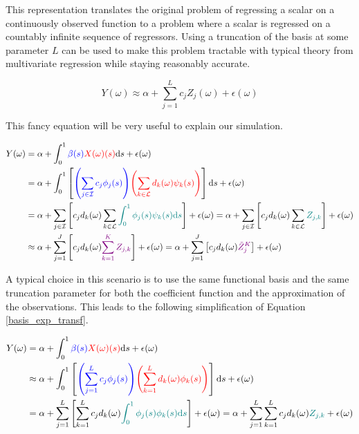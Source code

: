\documentclass[11pt,twoside,a4paper]{article}
\begin{document}
	This representation translates the original problem of regressing a scalar on a continuously observed function to a problem where a scalar is regressed on a countably infinite sequence of regressors. Using a truncation of the basis at some parameter $L$ can be used to make this problem tractable with typical theory from multivariate regression while staying reasonably accurate.
	
	\begin{equation}
			Y(\omega) \approx \alpha + \sum_{j = 1}^{L} c_j Z_j(\omega) + \epsilon(\omega)
	\end{equation}

	{\color{red} This fancy equation will be very useful to explain our simulation.}
	
	\begin{equation}\label{basis_exp_transf}
		\begin{split}
			Y(\omega) & = \alpha + \int_{0}^{1} {\color{blue}\beta(s)} {\color{red}X(\omega)(s)}\mathrm{d}s + \epsilon(\omega) \\
			& = \alpha + \int_{0}^{1}\left[{\color{blue}\left(\sum_{j \in \mathcal{I}} c_j  \phi_j(s)\right)} {\color{red}\left(\sum_{k \in \mathcal{L}} d_k(\omega)  \psi_k(s)\right)} \right]\mathrm{d}s + \epsilon(\omega) \\
			& = \alpha + \sum_{j \in \mathcal{I}} \left[ c_j d_k(\omega)\sum_{k \in \mathcal{L}} \textcolor{teal}{ \int_{0}^{1} \phi_j(s) \psi_k(s) \mathrm{d}s}\right] + \epsilon(\omega)
			= \alpha + \sum_{j \in \mathcal{I}} \left[c_j d_k(\omega) \sum_{k \in \mathcal{L}}  \textcolor{teal}{Z_{j, k}} \right] + \epsilon(\omega) \\
			& \approx \alpha + \sum_{j = 1}^{J} \left[c_j d_k(\omega) \textcolor{violet}{\sum_{k = 1}^{K}  Z_{j, k}} \right] + \epsilon(\omega)
			= \alpha + \sum_{j = 1}^{J} \left[c_j d_k(\omega)\textcolor{violet}{\tilde{Z}_{j}^{K}} \right] + \epsilon(\omega)	
		\end{split}
	\end{equation}

	A typical choice in this scenario is to use the same functional basis and the same truncation parameter for both the coefficient function and the approximation of the observations. This leads to the following simplification of Equation \ref{basis_exp_transf}.

	\begin{equation}
		\begin{split}
			Y(\omega) & = \alpha + \int_{0}^{1} {\color{blue}\beta(s)} {\color{red}X(\omega)(s)}\mathrm{d}s + \epsilon(\omega) \\
			& \approx \alpha + \int_{0}^{1}\left[{\color{blue}\left(\sum_{j = 1}^{L} c_j  \phi_j(s)\right)} {\color{red}\left(\sum_{k  = 1}^{L} d_k(\omega)  \phi_k(s)\right)} \right]\mathrm{d}s + \epsilon(\omega) \\
			& = \alpha + \sum_{j = 1}^{L} \left[\sum_{k = 1}^{L} c_j d_k(\omega) \textcolor{teal}{ \int_{0}^{1} \phi_j(s) 	\phi_k(s) \mathrm{d}s}\right] + \epsilon(\omega)
			= \alpha + \sum_{j = 1}^{L} \sum_{k = 1}^{L}  c_j d_k(\omega)\textcolor{teal}{Z_{j, k}}  + 	\epsilon(\omega)	
		\end{split}
	\end{equation}
	
\end{document}
